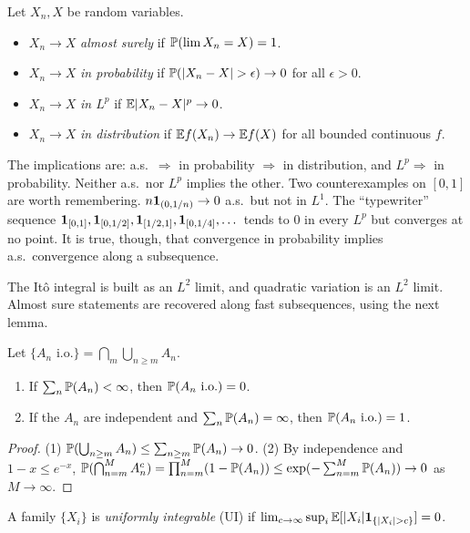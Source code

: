 \begin{definition}
Let $X_n,X$ be random variables.
\begin{itemize}
\item $X_n\to X$ \emph{almost surely} if $\mathbb{P}(\lim X_n=X)=1$.
\item $X_n\to X$ \emph{in probability} if $\Prob(|X_n-X|>\epsilon)\to0$ for all $\epsilon>0$.
\item $X_n\to X$ \emph{in $L^p$} if $\mathbb{E}|X_n-X|^p\to0$.
\item $X_n\to X$ \emph{in distribution} if $\mathbb{E} f(X_n)\to\mathbb{E} f(X)$ for all bounded continuous $f$.
\end{itemize}
\end{definition}

The implications are: a.s.\ $\Rightarrow$ in probability $\Rightarrow$ in distribution, and $L^p\Rightarrow$ in probability. Neither a.s.\ nor $L^p$ implies the other. Two counterexamples on $[0,1]$ are worth remembering. $n\mathbf{1}_{(0,1/n)}\to0$ a.s.\ but not in $L^1$. The ``typewriter'' sequence $\mathbf{1}_{[0,1]},\mathbf{1}_{[0,1/2]},\mathbf{1}_{[1/2,1]},\mathbf{1}_{[0,1/4]},\dots$ tends to $0$ in every $L^p$ but converges at no point. It is true, though, that convergence in probability implies a.s.\ convergence along a subsequence.

The It\^o integral is built as an $L^2$ limit, and quadratic variation is an $L^2$ limit. Almost sure statements are recovered along fast subsequences, using the next lemma.

\begin{lemma}\label{lem:bc}
Let $\{A_n\text{ i.o.}\}=\bigcap_m\bigcup_{n\ge m}A_n$.
\begin{enumerate}
\item If $\sum_n\mathbb{P}(A_n)<\infty$, then $\mathbb{P}(A_n\text{ i.o.})=0$.
\item If the $A_n$ are independent and $\sum_n\mathbb{P}(A_n)=\infty$, then $\mathbb{P}(A_n\text{ i.o.})=1$.
\end{enumerate}
\end{lemma}
\begin{proof}
(1) $\mathbb{P}(\bigcup_{n\ge m}A_n)\le\sum_{n\ge m}\mathbb{P}(A_n)\to0$. (2) By independence and $1-x\le e^{-x}$, $\mathbb{P}(\bigcap_{n=m}^{M}A_n^c)=\prod_{n=m}^M(1-\mathbb{P}(A_n))\le\exp(-\sum_{n=m}^M\mathbb{P}(A_n))\to0$ as $M\to\infty$.
\end{proof}

\begin{definition}
A family $\{X_i\}$ is \emph{uniformly integrable} (UI) if $\lim_{c\to\infty}\sup_i\E[|X_i|\ind_{\{|X_i|>c\}}]=0$.
\end{definition}

